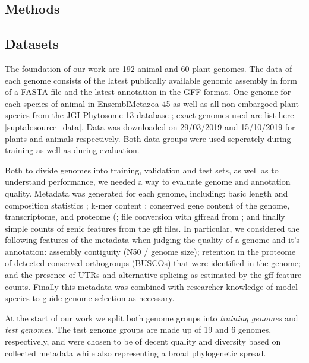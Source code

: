 \documentclass{bioinfo}
\newcounter{suptab}
\begin{document}
\begin{methods}
\section{Methods}
\subsection{Datasets}
The foundation of our work are 192 animal and 60 plant genomes. The data of each 
genome consists of the latest publically available genomic assembly in form of a 
FASTA file and the latest annotation in the GFF format. One genome for each species of animal 
in EnsemblMetazoa 45 \citep{howe2020ensembl} as well as all non-embargoed plant
species from the JGI Phytosome 13 database \citep{goodstein2012phytozome}; exact 
genomes used are list here \ref{suptab:source_data}. %
Data was downloaded on 29/03/2019 and 15/10/2019 for plants and animals respectively. 
Both data groups were used seperately during training as well as during evaluation. 

Both to divide genomes into training, validation and test sets, as well as to understand
performance, we needed a way to evaluate genome and annotation quality.
Metadata was generated for each genome, including: basic length and 
composition statistics \citep{gurevich2013quast}; k-mer content \citep{marccais2011fast};
conserved gene content of the genome, transcriptome, and proteome (\cite{simao2015busco};
file conversion with gffread from \cite{trapnell2012differential}; %
and finally simple counts of genic features from the gff files. In particular, 
we considered the following features of the metadata when judging the quality of a genome and it's 
annotation: assembly contiguity (N50 / genome size); retention in the proteome 
of detected conserved orthogroups (BUSCOs) that were identified in the genome; and
the presence of UTRs and alternative splicing as estimated by the gff feature-counts.
Finally this metadata was combined with researcher knowledge of model species to guide genome
selection as necessary.

At the start of our work we split both genome groups into {\it training genomes} and 
{\it test genomes}. The test genome groups are made up of 19 and 6 genomes, 
respectively, and were chosen to be of decent quality and diversity based on collected 
metadata while also representing a broad phylogenetic spread. 


\end{methods}
\end{document}

